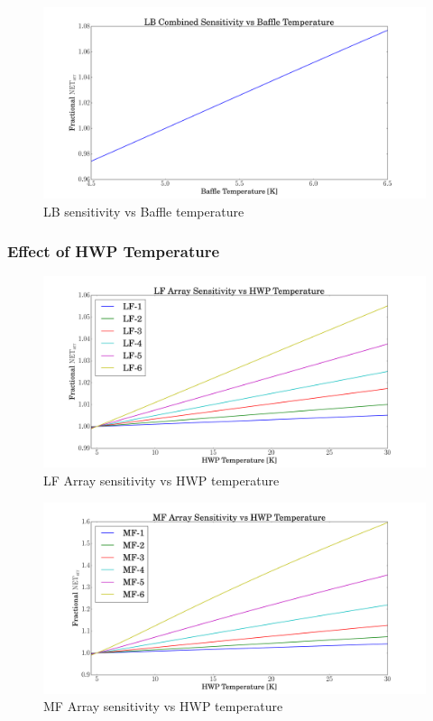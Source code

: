 \documentclass[12pt, titlepage]{article} %
\begin{document}
\begin{figure}[H]
	\centering
	\includegraphics[width=1.1\textwidth, center]{PDF/TempDependence_Baffle_LB.pdf}
	\caption{LB sensitivity vs Baffle temperature}
\end{figure}


\subsubsection{Effect of HWP Temperature}

\begin{figure}[H]
	\centering
	\includegraphics[width=1.1\textwidth, center]{PDF/TempDependence_HWP_LF.pdf}
	\caption{LF Array sensitivity vs HWP temperature}
\end{figure}

\begin{figure}[H]
	\centering
	\includegraphics[width=1.1\textwidth, center]{PDF/TempDependence_HWP_MF.pdf}
	\caption{MF Array sensitivity vs HWP temperature}
\end{figure}
	
\end{document}
